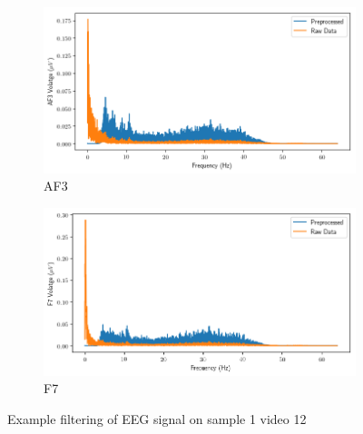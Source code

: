 \begin{figure}[h]
    \centering
    \begin{subfigure}[t]{\columnwidth}
        \centering
        \includegraphics[width=\columnwidth]{tex/figures/filtering/AF3.png}
        \caption{AF3}
        \label{fig:filter:af3}
    \end{subfigure}
    \hfill
    \begin{subfigure}[t]{\columnwidth}
        \centering
        \includegraphics[width=\columnwidth]{tex/figures/filtering/F7.png}
        \caption{F7}
        \label{fig:filter:f7}
    \end{subfigure}
    \caption{Example filtering of EEG signal on sample 1 video 12}
    \label{fig:eeg}



\end{figure}
